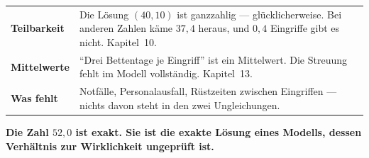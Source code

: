 \begin{warnung}
\begin{center}
\begin{minipage}{0.88\textwidth}
\end{minipage}
\end{center}
\end{warnung}

\begin{warnung}
\begin{center}
{\small
\renewcommand{\arraystretch}{1.52}
\begin{tabular}{@{}P{2.4cm}P{6.2cm}@{}}
\toprule
\textbf{Teilbarkeit} & Die Lösung $(40,10)$ ist ganzzahlig --- glücklicherweise. Bei anderen Zahlen käme $37{,}4$ heraus, und $0{,}4$ Eingriffe gibt es nicht. Kapitel~10.\\
\textbf{Mittelwerte} & \enquote{Drei Bettentage je Eingriff} ist ein Mittelwert. Die Streuung fehlt im Modell vollständig. Kapitel~13.\\
\textbf{Was fehlt} & Notfälle, Personalausfall, Rüstzeiten zwischen Eingriffen --- nichts davon steht in den zwei Ungleichungen.\\
\bottomrule
\end{tabular}}
\end{center}

\begin{center}
\begin{minipage}{0.9\textwidth}
\textbf{Die Zahl $52{,}0$ ist exakt. Sie ist die exakte Lösung eines Modells, dessen Verhältnis zur Wirklichkeit ungeprüft ist.}
\end{minipage}
\end{center}

\begin{center}
\begin{minipage}{0.88\textwidth}
\end{minipage}
\end{center}
\end{warnung}


